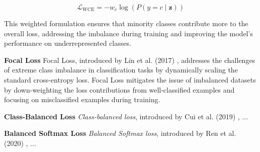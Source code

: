 \begin{equation}
    \mathcal{L}_{\text{WCE}} = -w_c \log(P(y = c \mid \mathbf{z}))
\end{equation}

This weighted formulation ensures that minority classes contribute more to the overall loss, addressing the imbalance during training and improving the model's performance on underrepresented classes.

\myindent \textbf{Focal Loss}
Focal Loss, introduced by Lin et al. (2017) \cite{lin2018focallossdenseobject}, addresses the challenges of extreme class imbalance in classification tasks by dynamically scaling the standard cross-entropy loss. Focal Loss mitigates the issue of imbalanced datasets by down-weighting the loss contributions from well-classified examples and focusing on misclassified examples during training.







\myindent \textbf{Class-Balanced Loss} \textit{Class-balanced loss}, introduced by Cui et al. (2019) \cite{cui2019classbalancedlossbasedeffective}, ...

\myindent \textbf{Balanced Softmax Loss} \textit{Balanced Softmax loss}, introduced by Ren et al. (2020) \cite{ren2020balancedmetasoftmaxlongtailedvisual}, ...

